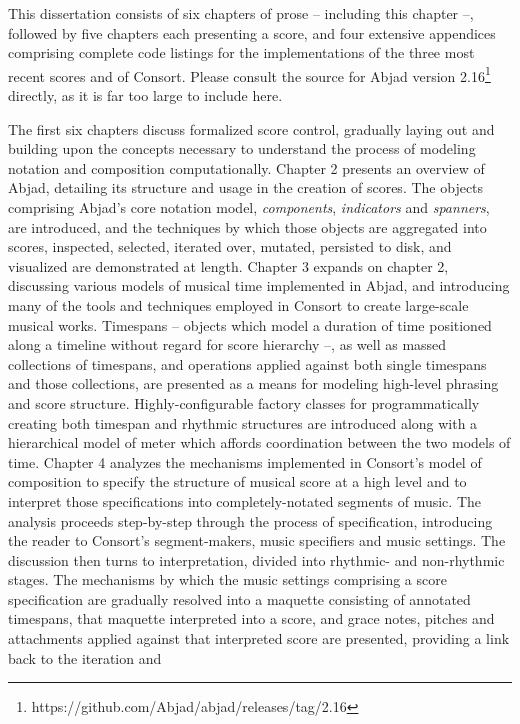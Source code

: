 This dissertation consists of six chapters of prose -- including this chapter
--, followed by five chapters each presenting a score, and four extensive
appendices comprising complete code listings for the implementations of the
three most recent scores and of Consort. Please consult the source for Abjad
version 2.16\footnote{https://github.com/Abjad/abjad/releases/tag/2.16}
directly, as it is far too large to include here.

The first six chapters discuss formalized score control, gradually laying out
and building upon the concepts necessary to understand the process of modeling
notation and composition computationally. Chapter 2 presents an overview of
Abjad, detailing its structure and usage in the creation of scores. The objects
comprising Abjad's core notation model, \emph{components}, \emph{indicators}
and \emph{spanners}, are introduced, and the techniques by which those objects
are aggregated into scores, inspected, selected, iterated over, mutated,
persisted to disk, and visualized are demonstrated at length. Chapter 3 expands
on chapter 2, discussing various models of musical time implemented in Abjad,
and introducing many of the tools and techniques employed in Consort to create
large-scale musical works. Timespans -- objects which model a duration of time
positioned along a timeline without regard for score hierarchy --, as well as
massed collections of timespans, and operations applied against both single
timespans and those collections, are presented as a means for modeling
high-level phrasing and score structure. Highly-configurable factory classes
for programmatically creating both timespan and rhythmic structures are
introduced along with a hierarchical model of meter which affords coordination
between the two models of time. Chapter 4 analyzes the mechanisms implemented
in Consort's model of composition to specify the structure of musical score at
a high level and to interpret those specifications into completely-notated
segments of music. The analysis proceeds step-by-step through the process of
specification, introducing the reader to Consort's segment-makers, music
specifiers and music settings. The discussion then turns to interpretation,
divided into rhythmic- and non-rhythmic stages. The mechanisms by which the
music settings comprising a score specification are gradually resolved into a
maquette consisting of annotated timespans, that maquette interpreted into a
score, and grace notes, pitches and attachments applied against that
interpreted score are presented, providing a link back to the iteration and
